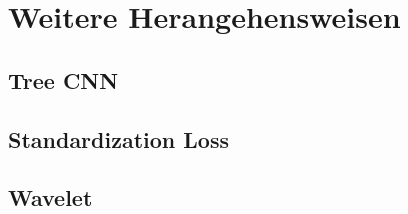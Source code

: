 \chapter{Weitere Herangehensweisen}


\section{Tree CNN}


\section{Standardization Loss}


\section{Wavelet}
